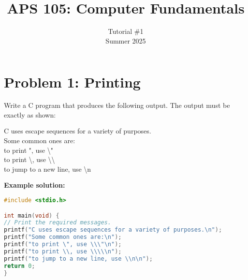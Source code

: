 \documentclass[12pt]{article}
\begin{document}
 
 
\title{APS 105: Computer Fundamentals}
\date{}
\author{Tutorial \#1\\ 
Summer 2025}

\maketitle

\section*{Problem 1: Printing}
Write a C program that produces the following output. The output must be exactly as shown:


\begin{tcolorbox}[colback=gray!10, boxrule=0pt, sharp corners, enhanced jigsaw, left=3mm, right=3mm, top=1mm, bottom=1mm]
	C uses escape sequences for a variety of purposes. \\
	Some common ones are: \\
	to print ", use \textbackslash" \\
	to print \textbackslash, use \textbackslash\textbackslash \\
	to jump to a new line, use \textbackslash n
\end{tcolorbox}
\textbf{Example solution:}
\begin{lstlisting}[language=C]
#include <stdio.h>

int main(void) {
// Print the required messages.
printf("C uses escape sequences for a variety of purposes.\n");
printf("Some common ones are:\n");
printf("to print \", use \\\"\n");
printf("to print \\, use \\\\\n");
printf("to jump to a new line, use \\n\n");
return 0;
}

\end{lstlisting}
\end{document}
